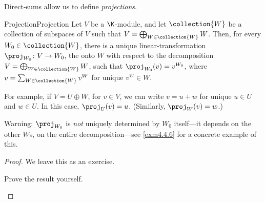 Direct-sums allow us to define \emph{projections}.
\begin{prp}{Projection}{Projection}
	Let $V$ be a $\K$-module, and let $\collection{W}$ be a collection of subspaces of $V$ such that $V=\bigoplus _{W\in \collection{W}}W$.  Then, for every $W_0\in \collection{W}$, there is a unique linear-transformation $\proj _{W_0}\colon V\rightarrow W_0$, the  onto $W$ with respect to the decomposition $V=\bigoplus _{W\in \collection{W}}W$, such that $\proj _{W_0}(v)=v^{W_0}$, where $v=\sum _{W\in \collection{W}}v^W$ for unique $v^W\in W$.
	\begin{rmk}
		For example, if $V=U\oplus W$, for $v\in V$, we can write $v=u+w$ for unique $u\in U$ and $w\in U$.  In this case, $\proj _U(v)=u$.  (Similarly, $\proj _W(v)=w$.)
	\end{rmk}
	\begin{rmk}
		Warning:  $\proj _{W_0}$ is \emph{not} uniquely determined by $W_0$ itself---it depends on the other $W$s, on the entire decomposition---see \cref{exm4.4.6} for a concrete example of this.
	\end{rmk}
	\begin{proof}
		We leave this as an exercise.
		\begin{exr}[breakable=false]{}{}
			Prove the result yourself.
		\end{exr}
	\end{proof} 
\end{prp}
